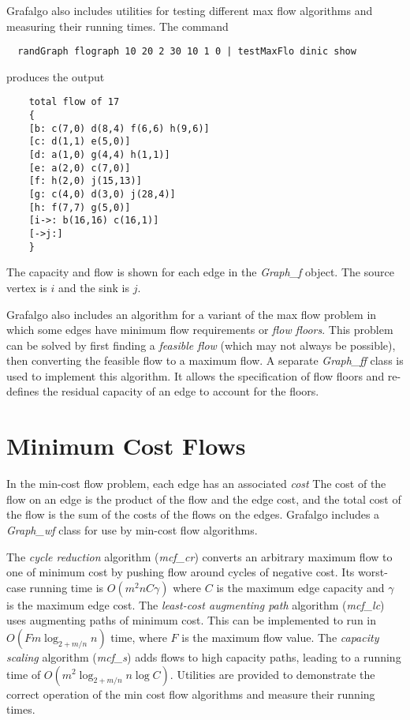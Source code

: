 \documentclass[11pt]{article}
\begin{document}
Grafalgo also includes utilities for testing different max flow algorithms and measuring their
running times. The command
\begin{verbatim}
  randGraph flograph 10 20 2 30 10 1 0 | testMaxFlo dinic show
\end{verbatim}
produces the output
\begin{verbatim}
    total flow of 17
    {
    [b: c(7,0) d(8,4) f(6,6) h(9,6)]
    [c: d(1,1) e(5,0)]
    [d: a(1,0) g(4,4) h(1,1)]
    [e: a(2,0) c(7,0)]
    [f: h(2,0) j(15,13)]
    [g: c(4,0) d(3,0) j(28,4)]
    [h: f(7,7) g(5,0)]
    [i->: b(16,16) c(16,1)]
    [->j:]
    }
\end{verbatim}
The capacity and flow is shown for each edge in the {\sl Graph\_f} object.
The source vertex is $i$ and the sink is $j$.

Grafalgo also includes an algorithm for a variant of the max flow problem in which
some edges have minimum flow requirements or {\sl flow floors}.
This problem can be solved by first finding a {\sl feasible flow} (which may not always be possible),
then converting the feasible flow to a maximum flow. A separate {\sl Graph\_ff} class is used to
implement this algorithm. It allows the specification of flow floors and re-defines the residual
capacity of an edge to account for the floors.

\section{Minimum Cost Flows}

In the min-cost flow problem, each edge has an associated {\sl cost}
The cost of the flow on an edge is the product of the flow and the edge cost,
and the total cost of the flow is the sum of the costs of the flows on the edges.
Grafalgo includes a {\sl Graph\_wf} class for use by min-cost flow algorithms.

The {\sl cycle reduction} algorithm ({\sl mcf\_cr}) converts an arbitrary maximum flow to one of minimum cost
by pushing flow around cycles of negative cost. Its worst-case running time is $O(m^2nC\gamma)$
where $C$ is the maximum edge capacity and $\gamma$ is the maximum edge cost.
The {\sl least-cost augmenting path} algorithm ({\sl mcf\_lc}) uses augmenting paths of minimum cost.
This can be implemented to run in $O(F m\log_{2+m/n} n)$ time, where $F$ is the maximum flow value.
The {\sl capacity scaling} algorithm ({\sl mcf\_s}) adds flows to high capacity paths, leading to a running time
of $O(m^2 \log_{2+m/n} n \log C)$.
Utilities are provided to demonstrate the correct operation of
the min cost flow algorithms and measure their running times.
\end{document}
